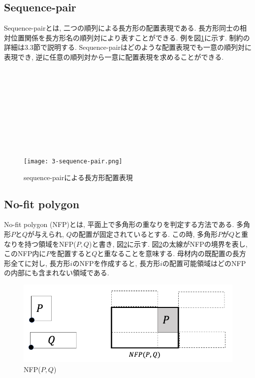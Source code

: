 \subsection{Sequence-pair}
Sequence-pairとは, 二つの順列による長方形の配置表現である\cite{seq-pair}. 
長方形同士の相対位置関係を長方形名の順列対により表すことができる. 
例を図\ref{s-p-eg}に示す. 制約の詳細は3.3節で説明する. 
Sequence-pairはどのような配置表現でも一意の順列対に表現でき, 逆に任意の順列対から一意に配置表現を求めることができる. \\ 
\\
\\ \\ \\ \\ \\ \\ \\ \\ 
\begin{figure}[hb]
    \hspace{2cm}
    \texttt{[image: 3-sequence-pair.png]}
    \caption{sequence-pairによる長方形配置表現}
    \label{s-p-eg}
\end{figure}


\subsection{No-fit polygon}
No-fit polygon (NFP)とは, 平面上で多角形の重なりを判定する方法である\cite{nfp}\cite{nfp2}. 
多角形$P$と$Q$が与えられ, $Q$の配置が固定されているとする. 
この時, 多角形$P$が$Q$と重なりを持つ領域をNFP($P,Q$)と書き, 図\ref{nfp-eg}に示す. 
図\ref{nfp-eg}の太線がNFPの境界を表し, このNFP内に$P$を配置すると$Q$と重なることを意味する. 
母材内の既配置の長方形全てに対し, 長方形$i$のNFPを作成すると, 長方形$i$の配置可能領域はどのNFPの内部にも含まれない領域である. \\

\begin{figure}[tbp]
    \hspace{3cm}
    \includegraphics[scale = 0.3, bb=0 0 10 10]{3nfp.png}
    \caption{NFP($P,Q$)}
    \label{nfp-eg}
\end{figure}


